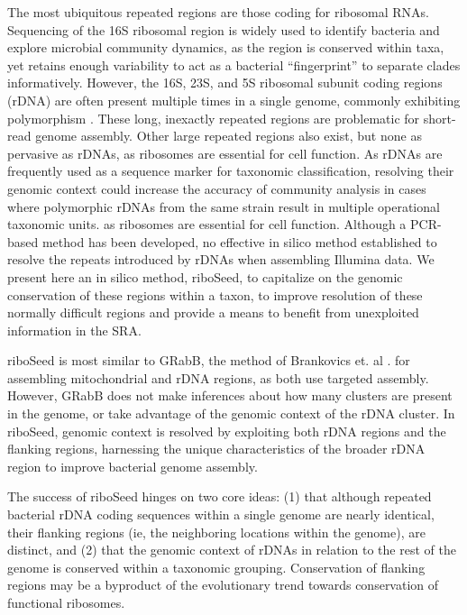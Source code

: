 \documentclass[11pt]{article}
\begin{document}
\begin{linenumbers}
The most ubiquitous repeated regions are those coding for ribosomal RNAs. Sequencing of the 16S ribosomal region is widely used to identify bacteria and explore microbial community dynamics\cite{Weisburg1991,Clarridge2004,Woese1990,Case2007}, as the region is conserved within taxa, yet retains enough variability to act as a bacterial “fingerprint” to separate clades informatively. However, the 16S, 23S, and 5S ribosomal subunit coding regions (rDNA) are often present multiple times in a single genome, commonly exhibiting polymorphism \cite{Coenye2003,Moreno2002,Lukjancenko2010, Větrovský2013}. These long, inexactly repeated regions\cite{Agrawal2016, Alkan2011} are problematic for short-read genome assembly. Other large repeated regions also exist, but none as pervasive as rDNAs, as ribosomes are essential for cell function. As rDNAs are frequently used as a sequence marker for taxonomic classification, resolving their genomic context could increase the accuracy of community analysis in cases where polymorphic rDNAs from the same strain result in multiple operational taxonomic units. as ribosomes are essential for cell function.  Although a PCR-based method has been developed\cite{Eastman2015}, no effective in silico method established to resolve the repeats introduced by rDNAs when assembling Illumina data. We present here an in silico method, riboSeed, to capitalize on the genomic conservation of these regions within a taxon, to improve resolution of these normally difficult regions and provide a means to benefit from unexploited information in the SRA.

riboSeed is most similar to GRabB, the method of Brankovics et. al \cite{Brankovics2016}. for assembling mitochondrial and rDNA regions, as both use targeted assembly. However, GRabB does not make inferences about how many clusters are present in the genome, or take advantage of the genomic context of the rDNA cluster. In riboSeed, genomic context is resolved by exploiting both rDNA regions and the flanking regions, harnessing the unique characteristics of the broader rDNA region to improve bacterial genome assembly.

The success of riboSeed hinges on two core ideas: (1)  that although repeated bacterial rDNA coding sequences within a single genome are nearly identical, their flanking regions (ie, the neighboring locations within the genome), are distinct, and (2) that the genomic context of rDNAs in relation to the rest of the genome is conserved within a taxonomic grouping. Conservation of flanking regions may be a byproduct of the evolutionary trend towards conservation of functional ribosomes.


\end{linenumbers}
\end{document}
